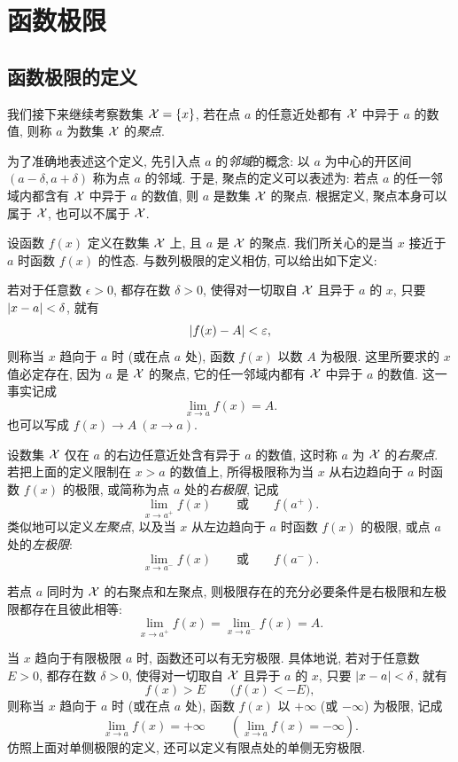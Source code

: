 \section{函数极限}
\subsection{函数极限的定义}\label{subsec:52}
我们接下来继续考察数集 $\mathcal{X}=\{x\}$,
{\kaishu 若在点 $a$ 的任意近处都有 $\mathcal{X}$ 中异于 $a$ 的数值,
则称 $a$ 为数集 $\mathcal{X}$ 的\emph{聚点}}.

为了准确地表述这个定义, 先引入点 $a$ 的\emph{邻域}的概念:
以 $a$ 为中心的开区间 $(a-\delta,a+\delta)$ 称为点 $a$ 的邻域.
于是, 聚点的定义可以表述为:
{\kaishu 若点 $a$ 的任一邻域内都含有 $\mathcal{X}$ 中异于 $a$ 的数值,
则 $a$ 是数集 $\mathcal{X}$ 的聚点.}
根据定义, 聚点本身可以属于 $\mathcal{X}$, 也可以不属于 $\mathcal{X}$.

设函数 $f(x)$ 定义在数集 $\mathcal{X}$ 上, 且 $a$ 是 $\mathcal{X}$ 的聚点.
我们所关心的是当 $x$ 接近于 $a$ 时函数 $f(x)$ 的性态.
与数列极限的定义相仿, 可以给出如下定义:

{\kaishu 若对于任意数 $\epsilon>0$, 都存在数 $\delta>0$,
使得对一切取自 $\mathcal{X}$ 且异于 $a$ 的 $x$, 只要 $\left| x-a \right|<\delta$, 就有
\begin{equation}\label{eq:function_limit_finite}
\left| f(x)-A \right|<\varepsilon,
\end{equation}
则称当 $x$ 趋向于 $a$ 时 (或在点 $a$ 处), 函数 $f(x)$ 以数 $A$ 为极限.}
这里所要求的 $x$ 值必定存在,
因为 $a$ 是 $\mathcal{X}$ 的聚点, 它的任一邻域内都有 $\mathcal{X}$ 中异于 $a$ 的数值.
这一事实记成
\begin{equation}\label{eq:function_limit_notation}
\lim_{x\to a}f(x)=A.
\end{equation}
也可以写成 $f(x)\to A\ (x\to a)$.

设数集 $\mathcal{X}$ 仅在 $a$ 的右边任意近处含有异于 $a$ 的数值,
这时称 $a$ 为 $\mathcal{X}$ 的\emph{右聚点}.
若把上面的定义限制在 $x>a$ 的数值上,
所得极限称为当 $x$ 从右边趋向于 $a$ 时函数 $f(x)$ 的极限,
或简称为点 $a$ 处的\emph{右极限}, 记成
$$
\lim_{x\to a^+}f(x)
\qquad\text{或}\qquad
f(a^+).
$$
类似地可以定义\emph{左聚点},
以及当 $x$ 从左边趋向于 $a$ 时函数 $f(x)$ 的极限,
或点 $a$ 处的\emph{左极限}:
$$
\lim_{x\to a^-}f(x)
\qquad\text{或}\qquad
f(a^-).
$$

若点 $a$ 同时为 $\mathcal{X}$ 的右聚点和左聚点,
则极限存在的充分必要条件是右极限和左极限都存在且彼此相等:
$$
\lim_{x\to a^+}f(x)=\lim_{x\to a^-}f(x)=A.
$$

当 $x$ 趋向于有限极限 $a$ 时, 函数还可以有无穷极限.
具体地说, {\kaishu 若对于任意数 $E>0$, 都存在数 $\delta>0$,
使得对一切取自 $\mathcal{X}$ 且异于 $a$ 的 $x$, 只要 $\left| x-a \right|<\delta$, 就有
\begin{equation}\label{eq:function_limit_infinite_at_finite_point}
f(x)>E
\qquad\bigl(f(x)<-E\bigr),
\end{equation}
则称当 $x$ 趋向于 $a$ 时 (或在点 $a$ 处),
函数 $f(x)$ 以 $+\infty$ (或 $-\infty$) 为极限, 记成
$$
\lim_{x\to a}f(x)=+\infty
\qquad\left(\lim_{x\to a}f(x)=-\infty\right).
$$}
仿照上面对单侧极限的定义, 还可以定义有限点处的单侧无穷极限.

